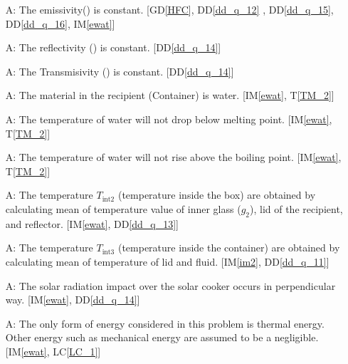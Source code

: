 \documentclass[12pt]{article}
\newcommand{\dref}[1]{GD\ref{#1}}
\newcommand{\ddref}[1]{DD\ref{#1}}
\newcommand{\tref}[1]{T\ref{#1}}
\newcounter{assumpnum} %
\newcommand{\iref}[1]{IM\ref{#1}}
\newcommand{\lcref}[1]{LC\ref{#1}}
\begin{document}
\begin{itemize}

\item[A\refstepcounter{assumpnum}\theassumpnum \label{A_1}:] The emissivity(\si{\epsilon}) is constant. [\dref{HFC}, \ddref{dd_q_12} , \ddref{dd_q_15}, \ddref{dd_q_16}, \iref{ewat}] 

\item[A\refstepcounter{assumpnum}\theassumpnum \label{A_2}:] The reflectivity (\si{\rho}) is constant. [\ddref{dd_q_14}]

\item[A\refstepcounter{assumpnum}\theassumpnum \label{A_3}:] The Transmisivity (\si{\tau}) is constant. [\ddref{dd_q_14}]

\item[A\refstepcounter{assumpnum}\theassumpnum \label{A_4}:] The material in the recipient (Container) is water. [\iref{ewat}, \tref{TM_2}] 

\item[A\refstepcounter{assumpnum}\theassumpnum \label{A_5}:]The  temperature of water will not drop below melting point. [\iref{ewat}, \tref{TM_2}]  

\item[A\refstepcounter{assumpnum}\theassumpnum \label{A_6}:]The temperature of water will not rise above the boiling point. [\iref{ewat}, \tref{TM_2}]   

\item[A\refstepcounter{assumpnum}\theassumpnum \label{A_7}:] The temperature $T_\text{int2}$ (temperature inside the box) are obtained by calculating mean of temperature value of inner glass ($g_2$), lid of the recipient, and reflector. [\iref{ewat}, \ddref{dd_q_13}] 

\item[A\refstepcounter{assumpnum}\theassumpnum \label{A_8}:] The temperature $T_\text{int3}$ (temperature inside the container) are obtained by calculating mean of temperature of lid and fluid. [\iref{im2}, \ddref{dd_q_11}]


\item[A\refstepcounter{assumpnum}\theassumpnum \label{A_9}:] The solar radiation impact over the solar cooker occurs in perpendicular way. [\iref{ewat}, \ddref{dd_q_14}] 

\item[A\refstepcounter{assumpnum}\theassumpnum \label{A_10}:] The only form of energy considered in this problem is thermal energy. Other energy such as mechanical energy are assumed to be a negligible. [\iref{ewat}, \lcref{LC_1}] 


\end{itemize}
\end{document}
